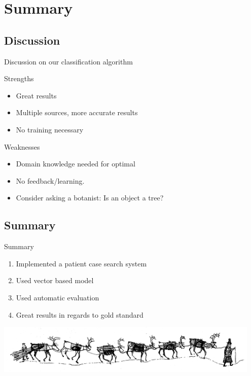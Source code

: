 \documentclass[screen, compress]{beamer}
\begin{document}
\section{Summary}

\subsection{Discussion}
\begin{frame}{Discussion on our classification algorithm} %
\begin{block}{Strengths}
\begin{itemize}
	\item Great results
	\item Multiple sources, more accurate results
	\item No training necessary
\end{itemize}
\end{block}

\begin{block}{Weaknesses}
\begin{itemize}
	\item Domain knowledge needed for optimal
	\item No feedback/learning.
	\item Consider asking a botanist: Is an object a tree?
\end{itemize}
\end{block}
\end{frame}

\subsection{Summary}
\begin{frame}{Summary} %
\LARGE
\begin{enumerate}
	\item Implemented a patient case search system
	\item Used vector based model
	\item Used automatic evaluation
	\item Great results in regards to gold standard
\end{enumerate}
\includegraphics[width=0.95\textwidth]{img/samii}
\end{frame}
\end{document}
